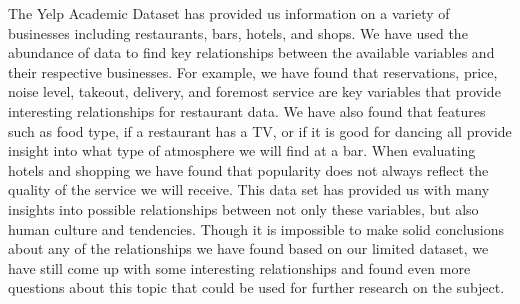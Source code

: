 \documentclass[11pt]{article}
\begin{document}
The Yelp Academic Dataset has provided us information on a variety of businesses including restaurants, bars, hotels, and shops.  We have used the abundance of data to find key relationships between the available variables and their respective businesses.  For example, we have found that reservations, price, noise level, takeout, delivery, and foremost service are key variables that provide interesting relationships for restaurant data.  We have also found that features such as food type, if a restaurant has a TV, or if it is good for dancing all provide insight into what type of atmosphere we will find at a bar.  When evaluating hotels and shopping we have found that popularity does not always reflect the quality of the service we will receive.  This data set has provided us with many insights into possible relationships between not only these variables, but also human culture and tendencies.  Though it is impossible to make solid conclusions about any of the relationships we have found based on our limited dataset, we have still come up with some interesting relationships and found even more questions about this topic that could be used for further research on the subject.
\end{document}
